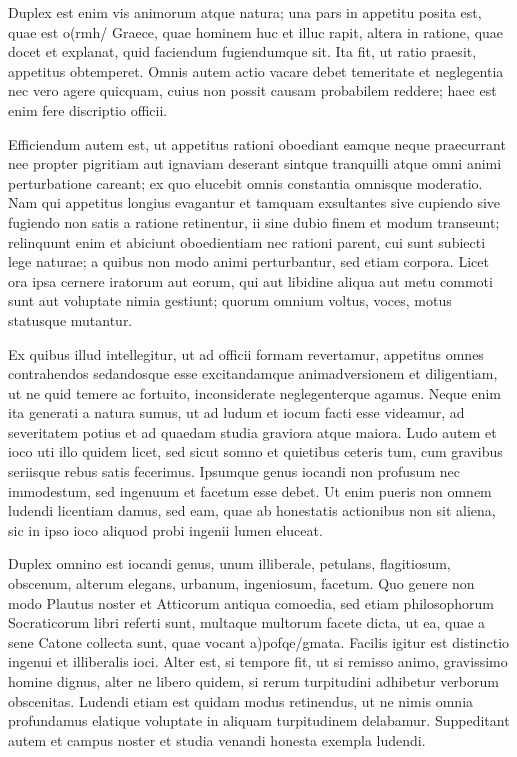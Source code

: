  Duplex est enim vis animorum atque natura; una pars in appetitu posita est, quae est o(rmh/ Graece, quae hominem huc et illuc rapit, altera in ratione, quae docet et explanat, quid faciendum fugiendumque sit. Ita fit, ut ratio praesit, appetitus obtemperet. Omnis autem actio vacare debet temeritate et neglegentia nec vero agere quicquam, cuius non possit causam probabilem reddere; haec est enim fere discriptio officii.

 Efficiendum autem est, ut appetitus rationi oboediant eamque neque praecurrant nee propter pigritiam aut ignaviam deserant sintque tranquilli atque omni animi perturbatione careant; ex quo elucebit omnis constantia omnisque moderatio. Nam qui appetitus longius evagantur et tamquam exsultantes sive cupiendo sive fugiendo non satis a ratione retinentur, ii sine dubio finem et modum transeunt; relinquunt enim et abiciunt oboedientiam nec rationi parent, cui sunt subiecti lege naturae; a quibus non modo animi perturbantur, sed etiam corpora. Licet ora ipsa cernere iratorum aut eorum, qui aut libidine aliqua aut metu commoti sunt aut voluptate nimia gestiunt; quorum omnium voltus, voces, motus statusque mutantur.

 Ex quibus illud intellegitur, ut ad officii formam revertamur, appetitus omnes contrahendos sedandosque esse excitandamque animadversionem et diligentiam, ut ne quid temere ac fortuito, inconsiderate neglegenterque agamus. Neque enim ita generati a natura sumus, ut ad ludum et iocum facti esse videamur, ad severitatem potius et ad quaedam studia graviora atque maiora. Ludo autem et ioco uti illo quidem licet, sed sicut somno et quietibus ceteris tum, cum gravibus seriisque rebus satis fecerimus. Ipsumque genus iocandi non profusum nec immodestum, sed ingenuum et facetum esse debet. Ut enim pueris non omnem ludendi licentiam damus, sed eam, quae ab honestatis actionibus non sit aliena, sic in ipso ioco aliquod probi ingenii lumen eluceat.

 Duplex omnino est iocandi genus, unum illiberale, petulans, flagitiosum, obscenum, alterum elegans, urbanum, ingeniosum, facetum. Quo genere non modo Plautus noster et Atticorum antiqua comoedia, sed etiam philosophorum Socraticorum libri referti sunt, multaque multorum facete dicta, ut ea, quae a sene Catone collecta sunt, quae vocant a)pofqe/gmata. Facilis igitur est distinctio ingenui et illiberalis ioci. Alter est, si tempore fit, ut si remisso animo, gravissimo homine dignus, alter ne libero quidem, si rerum turpitudini adhibetur verborum obscenitas. Ludendi etiam est quidam modus retinendus, ut ne nimis omnia profundamus elatique voluptate in aliquam turpitudinem delabamur. Suppeditant autem et campus noster et studia venandi honesta exempla ludendi.


